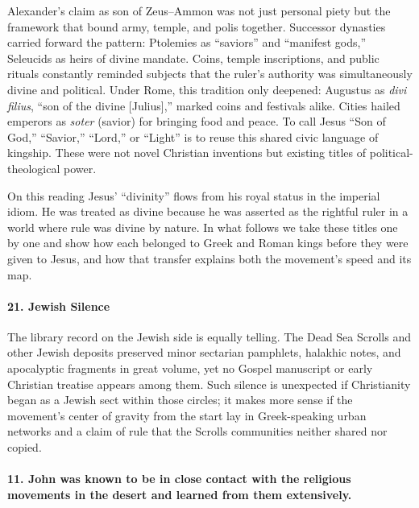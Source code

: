 Alexander’s claim as son of Zeus–Ammon was not just personal piety but the framework that bound army, temple, and polis together.
Successor dynasties carried forward the pattern: Ptolemies as “saviors” and “manifest gods,” Seleucids as heirs of divine mandate.
Coins, temple inscriptions, and public rituals constantly reminded subjects that the ruler’s authority was simultaneously divine and political.
Under Rome, this tradition only deepened: Augustus as \emph{divi filius}, “son of the divine [Julius],” marked coins and festivals alike.
Cities hailed emperors as \emph{soter} (savior) for bringing food and peace.
To call Jesus “Son of God,” “Savior,” “Lord,” or “Light” is to reuse this shared civic language of kingship.
These were not novel Christian inventions but existing titles of political-theological power.

On this reading Jesus’ “divinity” flows from his royal status in the imperial idiom.
He was treated as divine because he was asserted as the rightful ruler in a world where rule was divine by nature.
In what follows we take these titles one by one and show how each belonged to Greek and Roman kings before they were given to Jesus, and how that transfer explains both the movement’s speed and its map.


\paragraph{21.
Jewish Silence}\label{par:jewish-silence}

The library record on the Jewish side is equally telling.
The Dead Sea Scrolls and other Jewish deposits preserved minor sectarian pamphlets, halakhic notes, and apocalyptic fragments in great volume, yet no Gospel manuscript or early Christian treatise appears among them.
Such silence is unexpected if Christianity began as a Jewish sect within those circles; it makes more sense if the movement’s center of gravity from the start lay in Greek-speaking urban networks and a claim of rule that the Scrolls communities neither shared nor copied.

\paragraph{11.
John was known to be in close contact with the religious movements in the desert and learned from them extensively.}\label{par:john-was-known-to-be-in-close-contact-with-the-religious-movements-in-the-desert-and-learned-from-them-extensively.}

